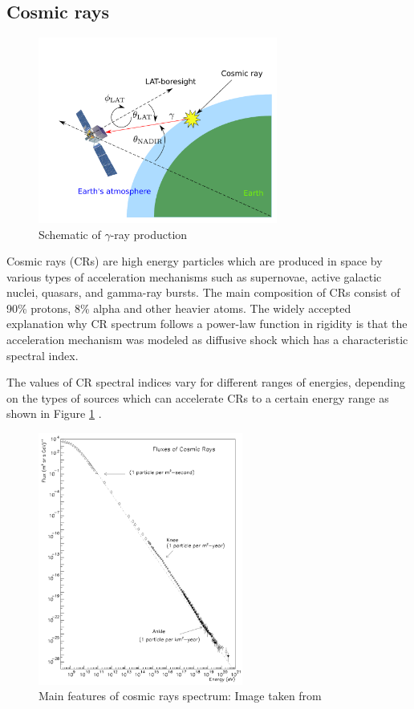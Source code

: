 \subsection{Cosmic rays}
\begin{figure}[h!]
    \centering
    \includegraphics[width=0.7\textwidth]{img/gamma_production_schematic}
    \caption{Schematic of $\gamma$-ray production}
\end{figure}
Cosmic rays (CRs) are high energy particles which are produced in space by various types
of acceleration mechanisms such as supernovae, active galactic nuclei, quasars, and
gamma-ray bursts. The main composition of CRs consist of 90\% protons, 8\% alpha
and other heavier atoms.
The widely accepted explanation why CR spectrum follows a power-law function in rigidity is that the acceleration mechanism was modeled as diffusive shock which has a characteristic spectral index.

\par The values of CR spectral indices vary for different ranges of energies, depending on the types of sources which can accelerate CRs to a certain energy range as shown in Figure \ref{fig:cr_famous_spectrum} \cite{Swordy2001}.
\begin{figure}[h!]
\centering
    \includegraphics[width=0.6\textwidth]{img/Swordy}
    \caption{Main features of cosmic rays spectrum: Image taken from \citet{Swordy2001}}
    \label{fig:cr_famous_spectrum}
\end{figure}

